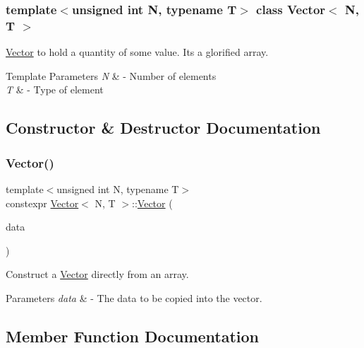 \subsubsection*{template$<$unsigned int N, typename T$>$\newline
class Vector$<$ N, T $>$}

\mbox{\hyperlink{class_vector}{Vector}} to hold a quantity of some value. It\textquotesingle{}s a glorified array. 
\begin{DoxyTemplParams}{Template Parameters}
{\em N} & -\/ Number of elements \\
\hline
{\em T} & -\/ Type of element \\
\hline
\end{DoxyTemplParams}


\subsection{Constructor \& Destructor Documentation}
\mbox{\label{class_vector_abae6eb6eff55acb2894297c9f734c2d9}} 
\subsubsection{\texorpdfstring{Vector()}{Vector()}}
{\footnotesize\ttfamily template$<$unsigned int N, typename T$>$ \\
constexpr \mbox{\hyperlink{class_vector}{Vector}}$<$ N, T $>$\+::\mbox{\hyperlink{class_vector}{Vector}} (\begin{DoxyParamCaption}\item[{std\+::array$<$ T, N $>$}]{data }\end{DoxyParamCaption})}

Construct a \mbox{\hyperlink{class_vector}{Vector}} directly from an array. 
\begin{DoxyParams}{Parameters}
{\em data} & -\/ The data to be copied into the vector. \\
\hline
\end{DoxyParams}


\subsection{Member Function Documentation}
\mbox{\label{class_vector_ae8a43ee89f0a311a44711db03c1ddb4b}} 
